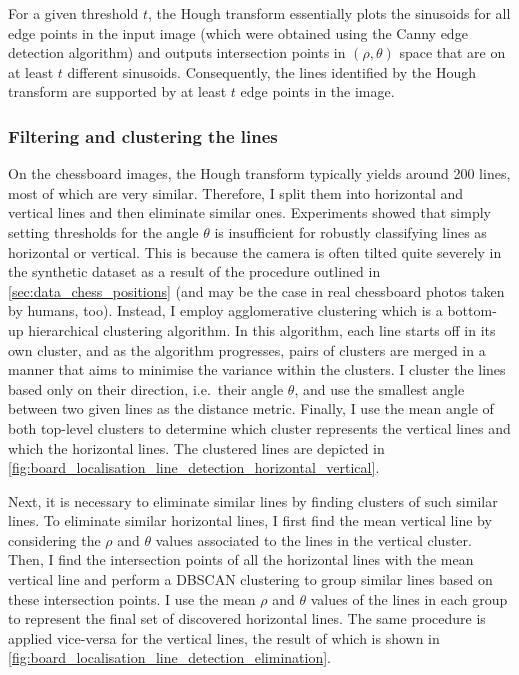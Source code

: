 \documentclass[../report.tex]{subfiles}
\begin{document}
For a given threshold $t$, the Hough transform essentially plots the sinusoids for all edge points in the input image (which were obtained using the Canny edge detection algorithm) and outputs intersection points in $(\rho,\theta)$ space that are on at least $t$ different sinusoids.
Consequently, the lines identified by the Hough transform are supported by at least $t$ edge points in the image.

\subsubsection{Filtering and clustering the lines}
On the chessboard images, the Hough transform typically yields around 200 lines, most of which are very similar. 
Therefore, I split them into horizontal and vertical lines and then eliminate similar ones.
Experiments showed that simply setting thresholds for the angle $\theta$ is insufficient for robustly classifying lines as horizontal or vertical.
This is because the camera is often tilted quite severely in the synthetic dataset as a result of the procedure outlined in \cref{sec:data_chess_positions} (and may be the case in real chessboard photos taken by humans, too).
Instead, I employ agglomerative clustering which is a bottom-up hierarchical clustering algorithm.
In this algorithm, each line starts off in its own cluster, and as the algorithm progresses, pairs of clusters are merged in a manner that aims to minimise the variance within the clusters.
I cluster the lines based only on their direction, i.e.\ their angle $\theta$, and use the smallest angle between two given lines as the distance metric.
Finally, I use the mean angle of both top-level clusters to determine which cluster represents the vertical lines and which the horizontal lines.
The clustered lines are depicted in \cref{fig:board_localisation_line_detection_horizontal_vertical}.

Next, it is necessary to eliminate similar lines by finding clusters of such similar lines.
To eliminate similar horizontal lines, I first find the mean vertical line by considering the $\rho$ and $\theta$ values associated to the lines in the vertical cluster.
Then, I find the intersection points of all the horizontal lines with the mean vertical line and perform a DBSCAN clustering \cite{ester1996} to group similar lines based on these intersection points.
I use the mean $\rho$ and $\theta$ values of the lines in each group to represent the final set of discovered horizontal lines. 
The same procedure is applied vice-versa for the vertical lines, the result of which is shown in \cref{fig:board_localisation_line_detection_elimination}.
\end{document}
